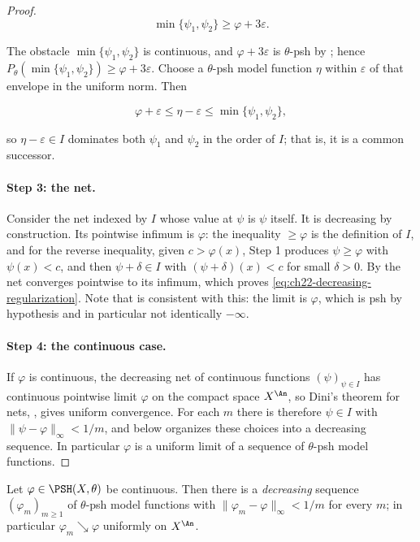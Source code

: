 \begin{proof}
\[
                   \min\{\psi_1,\psi_2\}\geq\varphi+3\varepsilon .
\tag{22.79}\label{eq:ch22-strict-gap}
\]

The obstacle $\min\{\psi_1,\psi_2\}$ is continuous, and
$\varphi+3\varepsilon$ is $\theta$-psh by
; hence
$P_\theta(\min\{\psi_1,\psi_2\})\geq\varphi+3\varepsilon$.  Choose a
$\theta$-psh model function $\eta$ within $\varepsilon$ of that
envelope in the uniform norm.  Then

\[
       \varphi+\varepsilon
       \leq\eta-\varepsilon
       \leq\min\{\psi_1,\psi_2\},
\tag{22.80}\label{eq:ch22-directed-majorant}
\]

so $\eta-\varepsilon\in I$ dominates both $\psi_1$ and $\psi_2$ in the
order of $I$; that is, it is a common successor.

\paragraph{Step 3: the net.}
Consider the net indexed by $I$ whose value at $\psi$ is $\psi$
itself.  It is decreasing by construction.  Its pointwise infimum is
$\varphi$: the inequality $\geq\varphi$ is the definition of $I$, and
for the reverse inequality, given $c>\varphi(x)$, Step 1 produces
$\psi\geq\varphi$ with $\psi(x)<c$, and then
$\psi+\delta\in I$ with $(\psi+\delta)(x)<c$ for small $\delta>0$.
By  the net converges pointwise to its
infimum, which proves \eqref{eq:ch22-decreasing-regularization}.  Note that
 is consistent with this: the limit is
$\varphi$, which is psh by hypothesis and in particular not identically
$-\infty$.

\paragraph{Step 4: the continuous case.}
If $\varphi$ is continuous, the decreasing net of continuous functions
$(\psi)_{\psi\in I}$ has continuous pointwise limit $\varphi$ on the
compact space $X^{\An}$, so Dini's theorem for nets,
, gives uniform convergence.  For each $m$ there is
therefore $\psi\in I$ with $\|\psi-\varphi\|_\infty<1/m$, and
 below organizes these choices
into a decreasing sequence.  In particular $\varphi$ is a uniform limit of
a sequence of $\theta$-psh model functions.
\end{proof}

\begin{corollary}
\label{cor:ch22-continuous-decreasing-sequence}
Let $\varphi\in\PSH(X,\theta)$ be continuous.  Then there is a
\emph{decreasing} sequence $(\varphi_m)_{m\geq1}$ of $\theta$-psh model
functions with
$\|\varphi_m-\varphi\|_{\infty}<1/m$ for every $m$; in particular
$\varphi_m\searrow\varphi$ uniformly on $X^{\An}$.
\end{corollary}

